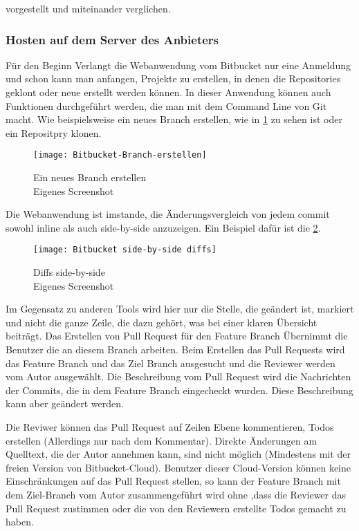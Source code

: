 vorgestellt und miteinander verglichen.

\subsubsection{Hosten auf dem Server des Anbieters}
\label{subsubsec:Bitbucket-Cloud}

Für den Beginn Verlangt die Webanwendung vom Bitbucket nur eine Anmeldung und schon kann man anfangen, Projekte zu erstellen, in denen die Repositories geklont oder neue erstellt werden können. In dieser Anwendung können auch Funktionen durchgeführt werden, die man mit dem Command Line von Git macht. Wie beispielsweise ein neues Branch erstellen, wie in \cref{fig:Bitbucket-Branch-erstellen} zu sehen ist oder ein Repositpry klonen.

\begin{figure}[H]
	\centering
	\texttt{[image: Bitbucket-Branch-erstellen]}
	\caption[Branch auf Bitbuckets Anwendung erstellen]{Ein neues Branch erstellen\\Eigenes Screenshot}
	\label{fig:Bitbucket-Branch-erstellen}
\end{figure}

Die Webanwendung ist imstande, die Änderungsvergleich von jedem commit sowohl inline als auch side-by-side anzuzeigen. Ein Beispiel dafür ist die \cref{fig:Diffs_side-by-side}.

\begin{figure}[H]
	\centering
	\texttt{[image: Bitbucket side-by-side diffs]}
	\caption[Bitbuckets Webanwendung side-by-side Änerungsvergleich]{Diffs side-by-side\\Eigenes Screenshot}
	\label{fig:Diffs_side-by-side}
\end{figure}

Im Gegensatz zu anderen Tools wird hier nur die Stelle, die geändert ist, markiert und nicht die ganze Zeile, die dazu gehört, was bei einer klaren Übersicht beiträgt.
Das Erstellen von Pull Request für den Feature Branch Übernimmt die Benutzer die an diesem Branch arbeiten. Beim Erstellen das Pull Requests wird das Feature Branch und das Ziel Branch ausgesucht und die Reviewer werden vom Autor ausgewählt. Die Beschreibung vom Pull Request wird die Nachrichten der Commits, die in dem Feature Branch eingecheckt wurden. Diese Beschreibung kann aber geändert werden.

Die Reviwer können das Pull Request auf Zeilen Ebene kommentieren, Todos erstellen (Allerdings nur nach dem Kommentar). Direkte Änderungen am Quelltext, die der Autor annehmen kann, sind nicht möglich (Mindestens mit der freien Version von Bitbucket-Cloud). Benutzer dieser Cloud-Version können keine Einschränkungen auf das Pull Request stellen, so kann der Feature Branch mit dem Ziel-Branch vom Autor zusammengeführt wird ohne ,dass die Reviewer das Pull Request zustimmen oder die von den Reviewern erstellte Todos gemacht zu haben.

